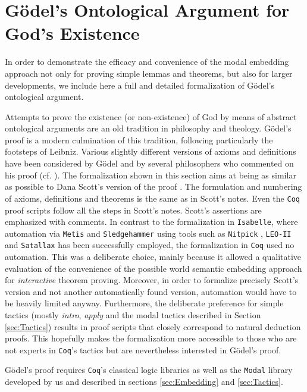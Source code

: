 \documentclass{llncs}
\newcommand{\Coq}{\texttt{Coq}\xspace}
\newcommand{\Isabelle}{\texttt{Isabelle}\xspace}
\begin{document}
\section{G\"odel's Ontological Argument for God's Existence}
\label{sec:proof}

In order to demonstrate the efficacy and convenience of the modal
embedding approach not only for proving simple lemmas and theorems,
but also for larger developments, we include here a full and detailed
formalization of Gödel's ontological argument.

Attempts to prove the existence (or non-existence) of God by means of
abstract ontological arguments are an old tradition in philosophy and
theology. G\"{o}del's proof \cite{Goedel1970,GoedelNotes} is a
modern culmination of this tradition, following particularly the
footsteps of Leibniz. Various slightly different versions of axioms
and definitions have been considered by G\"{o}del and by several
philosophers who commented on his proof (cf. 
\cite{sobel2004logic,AndersonGettings,Fitting,Adams,ContemporaryBibliography}).
The formalization shown in this section aims at being as similar as
possible to Dana Scott's version of the proof \cite{ScottNotes}. The
formulation and numbering of axioms, definitions and theorems is the
same as in Scott's notes. Even the \Coq proof scripts follow all the
steps in Scott's notes. Scott's assertions are emphasized with
comments. In contrast to the formalization in \Isabelle \cite{AFP},
where automation via \texttt{Metis} \cite{Hurd03first-orderproof} and
\texttt{Sledgehammer} \cite{Sledgehammer} using tools such as
\texttt{Nitpick} \cite{Nitpick}, \texttt{LEO-II} \cite{LEO-II} and
\texttt{Satallax} \cite{Satallax} has been successfully employed, the
formalization in \Coq used no automation. This was a deliberate
choice, mainly because it allowed a qualitative evaluation of the
convenience of the possible world semantic embedding approach for
\emph{interactive} theorem proving. Moreover, in order to formalize
precisely Scott's version and not another automatically found version,
automation would have to be heavily limited anyway. Furthermore, the
deliberate preference for simple tactics (mostly \emph{intro},
\emph{apply} and the modal tactics described in Section
\ref{sec:Tactics}) results in proof scripts that closely correspond to
natural deduction proofs. This hopefully makes the formalization more
accessible to those who are not experts in \Coq's tactics but are
nevertheless interested in G\"odel's proof.

Gödel's proof requires \Coq's classical logic libraries as well as the
\texttt{Modal} library developed by us and described in sections
\ref{sec:Embedding} and \ref{sec:Tactics}.
\end{document}
